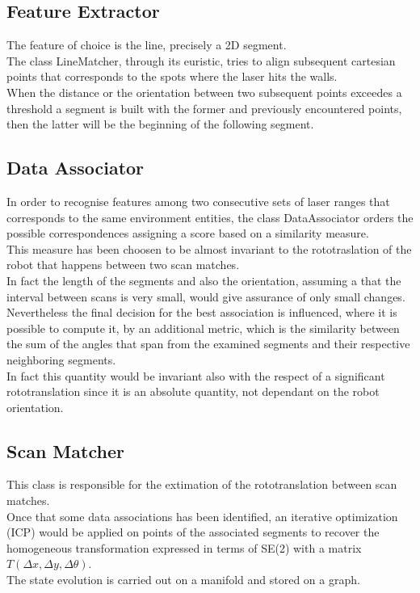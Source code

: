 \subsection{ Feature Extractor}
The feature of choice is the line, precisely a 2D segment.\\
The class LineMatcher, through its euristic, tries to align subsequent
cartesian points that corresponds to the spots where the laser hits the
walls.\\ When the distance or the orientation between two subsequent points
exceedes a threshold a segment is built with the former and previously
encountered points, then the latter will be the beginning of the following
segment.
\subsection{ Data Associator}
In order to recognise features among two consecutive sets of laser ranges
that corresponds to the same environment entities, the class DataAssociator
orders the possible correspondences assigning a score based on a similarity
measure.\\This measure has been choosen  to be almost invariant to the
rototraslation  of the robot that happens between two scan matches.\\
In fact the length of the segments and  also the orientation, assuming a
that the interval between scans is very small, would give assurance of
only small changes.\\ Nevertheless the final decision for the best
association is influenced, where it is possible to compute it, by an
additional metric, which is the similarity between the sum of the angles
that span from the examined segments and their respective neighboring
segments.\\ In fact this quantity would be invariant also with the respect
of a significant rototranslation since it is an absolute quantity, not
dependant on the robot orientation.

\subsection{ Scan Matcher }
This class is responsible for the extimation of the rototranslation
between scan matches.\\Once that some data associations has been
identified, an iterative optimization (ICP) would be applied on
points of the associated segments to recover the homogeneous
transformation expressed in terms of SE(2) with a matrix
$T(\Delta x,\Delta y,\Delta \theta)$.\\
The state evolution is carried out on a manifold and stored on a graph.

